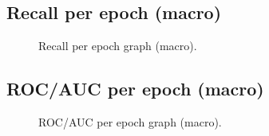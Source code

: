 \documentclass[a4paper,oneside,11pt]{book}
\begin{document}
\subsection{Recall per epoch (macro)}
\begin{figure}[H]
    \centering
    \caption{Recall per epoch graph (macro).}
\end{figure}
\subsection{ROC/AUC per epoch (macro)}
\begin{figure}[H]
    \centering
    \caption{ROC/AUC per epoch graph (macro).}
\end{figure}
\end{document}
